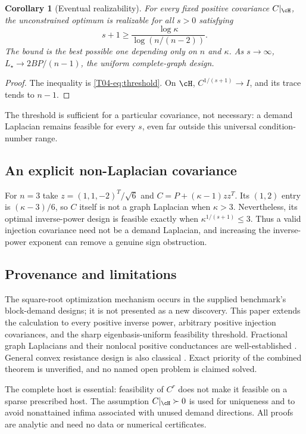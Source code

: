 \documentclass[11pt,a4paper]{article}
\newtheorem{corollary}[theorem]{Corollary}
\theoremstyle{definition}\newtheorem{definition}[theorem]{Definition}
\theoremstyle{remark}\newtheorem{remark}[theorem]{Remark}
\numberwithin{equation}{section}
\begin{document}
\begin{corollary}[Eventual realizability]
For every fixed positive covariance $C|_{\cH}$, the unconstrained optimum is realizable for all $s>0$ satisfying
\[
 s+1\ge\frac{\log\kappa}{\log(n/(n-2))}.
\]
The bound is the best possible one depending only on $n$ and $\kappa$. As $s\to\infty$, $L_\star\to 2BP/(n-1)$, the uniform complete-graph design.
\end{corollary}
\begin{proof}
The inequality is \eqref{T04-eq:threshold}. On $\cH$, $C^{1/(s+1)}\to I$, and its trace tends to $n-1$.
\end{proof}
The threshold is sufficient for a particular covariance, not necessary: a demand Laplacian remains feasible for every $s$, even far outside this universal condition-number range.

\subsection{An explicit non-Laplacian covariance}\label{T04-sec-5}
For $n=3$ take $z=(1,1,-2)^T/\sqrt6$ and $C=P+(\kappa-1)zz^T$. Its $(1,2)$ entry is $(\kappa-3)/6$, so $C$ itself is not a graph Laplacian when $\kappa>3$. Nevertheless, its optimal inverse-power design is feasible exactly when $\kappa^{1/(s+1)}\le3$. Thus a valid injection covariance need not be a demand Laplacian, and increasing the inverse-power exponent can remove a genuine sign obstruction.

\subsection{Provenance and limitations}\label{T04-sec-6}
The square-root optimization mechanism occurs in the supplied benchmark's block-demand designs; it is not presented as a new discovery. This paper extends the calculation to every positive inverse power, arbitrary positive injection covariances, and the sharp eigenbasis-uniform feasibility threshold. Fractional graph Laplacians and their nonlocal positive conductances are well-established \cite{ref042,ref043}. General convex resistance design is also classical \cite{ref036}. Exact priority of the combined theorem is unverified, and no named open problem is claimed solved.

The complete host is essential: feasibility of $C^r$ does not make it feasible on a sparse prescribed host. The assumption $C|_{\cH}\succ0$ is used for uniqueness and to avoid nonattained infima associated with unused demand directions. All proofs are analytic and need no data or numerical certificates.
\end{document}
